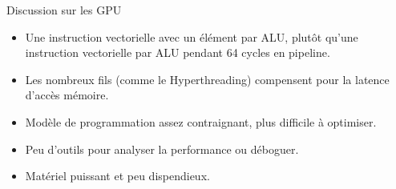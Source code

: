 \documentclass[10pt]{beamer}
\begin{document}
\begin{frame}{Discussion sur les GPU}

  \begin{itemize}
    \item Une instruction vectorielle avec un élément par ALU, plutôt qu'une instruction vectorielle par ALU pendant 64 cycles en pipeline.

    \item Les nombreux fils (comme le Hyperthreading) compensent pour la latence d'accès mémoire.

    \item Modèle de programmation assez contraignant, plus difficile à optimiser.

    \item Peu d'outils pour analyser la performance ou déboguer.

    \item Matériel puissant et peu dispendieux.
  \end{itemize}
\end{frame}
\end{document}
